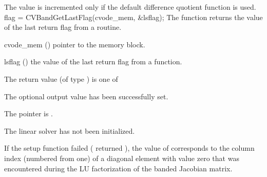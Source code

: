 {
  The value  is incremented only if the default 
   difference quotient function is used.
}
{
  flag = CVBandGetLastFlag(cvode\_mem, \&lsflag);
}
{
  The function  returns the
  value of the last return flag from a {\cvband} routine. 
}
{
  \begin{args}
  \item[cvode\_mem] ()
    pointer to the {\cvodes} memory block.
  \item[lsflag] ()
    the value of the last return flag from a {\cvband} function.
  \end{args}
}
{
  The return value  (of type ) is one of
  \begin{args}
  \item[\Id{CVBAND\_SUCCESS}] 
    The optional output value has been successfully set.
  \item[\Id{CVBAND\_MEM\_NULL}]
    The  pointer is .
  \item[\Id{CVBAND\_LMEM\_NULL}]
    The {\cvband} linear solver has not been initialized.
  \end{args}
}
{
  If the {\cvband} setup function failed ( returned ),
  the value of  corresponds to the column index (numbered from one) of
  a diagonal element with value zero that was encountered during the LU
  factorization of the banded Jacobian matrix.
}


